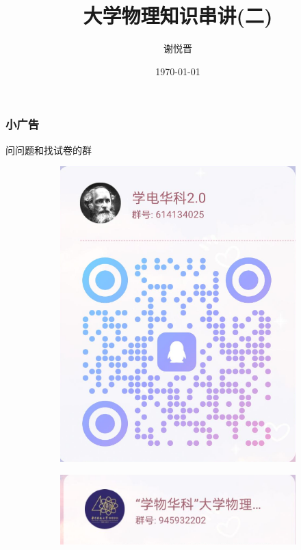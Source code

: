 \documentclass[UTF8]{ctexbeamer}
\title{大学物理知识串讲(二)}
\author{谢悦晋}
\institute[Huazhong University of Science and Technology]{提高2201班\\
	u202210333@hust.edu.cn}
\date{\today}
\begin{document}
\begin{frame}
\titlepage
\end{frame}


\begin{frame}
\frametitle{小广告}
问问题和找试卷的群
\begin{figure}[!ht]
	\centering
	\begin{minipage}{.49\textwidth}
		\begin{figure}[!ht]
				\centering
				\includegraphics[width=.9\textwidth]{37}
		\end{figure}
	\end{minipage}
		\begin{minipage}{.49\textwidth}
		\begin{figure}[!ht]
			\centering
			\includegraphics[width=1\textwidth]{38}
		\end{figure}
	\end{minipage}
\end{figure}
\end{frame}
\end{document}
